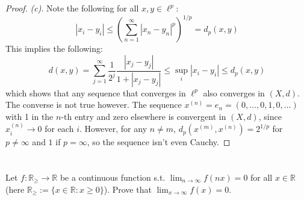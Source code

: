 \documentclass{article}
\newcommand{\R}{\mathbb{R}}
\theoremstyle{definition} %
\numberwithin{thm}{section} %
\theoremstyle{definition} %
\begin{document}
\begin{proof}
\textit{(c)}.
Note the following for all $x, y \in \ell^p$:
\[
    |x_i - y_i| \leq \left(\sum_{n = 1}^\infty |x_n - y_n|^p\right)^{1/p}
    = d_p(x, y)
\]
This implies the following:
\[
    d(x, y) = \sum_{j = 1}^\infty \frac{1}{2^j}
    \frac{|x_j - y_j|}{1 + |x_j - y_j|} \leq \sup_i|x_i - y_i| 
    \leq d_p(x, y)
\]
which shows that any sequence that converges in $\ell^p$ also converges
in $(X, d)$. The converse is not true however. The sequence 
$x^{(n)} = e_n = (0, \dots, 0, 1, 0, \dots)$ with 1 in the $n$-th entry
and zero elsewhere is convergent in $(X, d)$, since $x^{(n)}_i \to 0$
for each $i$. However, for any $n \neq m$, 
$d_p(x^{(m)}, x^{(n)}) = 2^{1/p}$ for $p \neq \infty$ 
and $1$ if $p = \infty$, so the sequence isn't even Cauchy.
\end{proof}

\section{}

Let $f: \R_\geq \to \R$ be a continuous function s.t. 
$\lim_{n\to\infty} f(nx) = 0$ for all $x \in \R$ (here
$\R_\geq := \{x \in \R : x \geq 0\}$). Prove that 
$\lim_{x \to \infty} f(x) = 0$.
\end{document}
